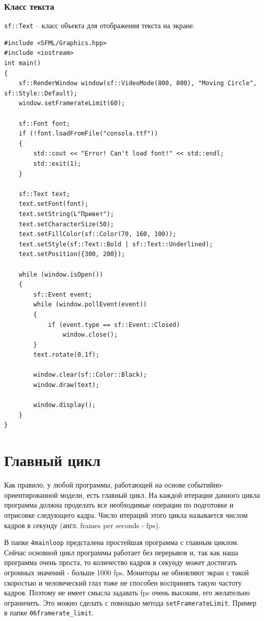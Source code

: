 \documentclass{article}
\begin{document}
\subsubsection*{Класс текста}
\texttt{sf::Text} -- класс объекта для отображения текста на экране.

\vspace{1.5cm}
\begin{lstlisting}
#include <SFML/Graphics.hpp>
#include <iostream>
int main()
{
    sf::RenderWindow window(sf::VideoMode(800, 800), "Moving Circle", sf::Style::Default);
    window.setFramerateLimit(60);
    
    sf::Font font;
    if (!font.loadFromFile("consola.ttf")) 
    {
        std::cout << "Error! Can't load font!" << std::endl;
        std::exit(1);
    }

    sf::Text text;
    text.setFont(font);
    text.setString(L"Привет");
    text.setCharacterSize(50);
    text.setFillColor(sf::Color(70, 160, 100));
    text.setStyle(sf::Text::Bold | sf::Text::Underlined);
    text.setPosition({300, 200});

    while (window.isOpen())
    {
        sf::Event event;
        while (window.pollEvent(event)) 
        {
            if (event.type == sf::Event::Closed)
                window.close();
        }
        text.rotate(0.1f);

        window.clear(sf::Color::Black);
        window.draw(text);

        window.display();
    }
}
\end{lstlisting}


\newpage
\section*{Главный цикл}
Как правило, у любой программы, работающей на основе событийно-ориентированной модели, есть главный цикл. На каждой итерации данного цикла программа должна проделать все необходимые операции по подготовке и отрисовке следующего кадра. Число итераций этого цикла называется числом кадров в секунду (англ. frames per seconds - fps).

В папке \texttt{4mainloop} предсталена простейшая программа с главным циклом. Сейчас основной цикл программы работает без перерывов и, так как наша программа очень проста, то количество кадров в секунду может достигать огромных значений - больше 1000 fps. Мониторы не обновляют экран с такой скоростью и человеческий глаз тоже не способен воспринять такую частоту кадров. Поэтому не имеет смысла задавать fps очень высоким, его желательно ограничить. Это можно сделать с помощью метода \texttt{setFramerateLimit}. Пример в папке \texttt{06framerate\_limit}.
\end{document}

